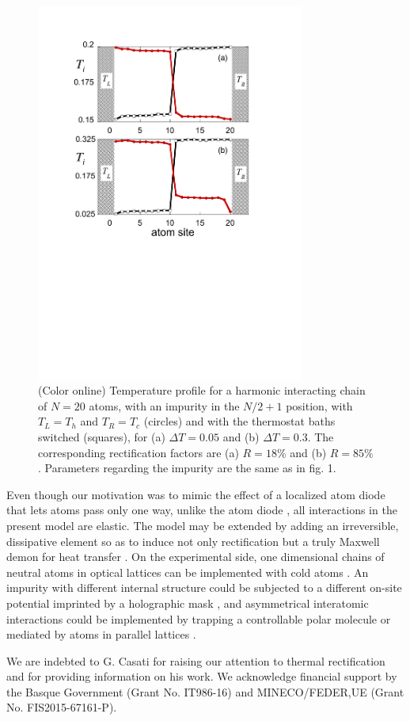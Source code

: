 \begin{figure}
\centering
\includegraphics[width=8.8cm]{Figures/FIG6.pdf}
\caption{(Color online) Temperature profile for a harmonic interacting chain of $N=20$ atoms, with an impurity in the $N/2+1$ position, with $T_L=T_h$ and $T_R=T_c$ (circles) and with the thermostat baths switched (squares), for (a) $\Delta T = 0.05$ and (b)  $\Delta T = 0.3$. The corresponding rectification factors are (a) $R=18\%$ and (b) $R=85\%$. Parameters regarding the impurity are the same as in fig. 1.
}
\label{figure6}
\end{figure}

Even though our motivation was to mimic the effect of a localized atom diode that lets atoms pass only one way,
unlike the atom diode \cite{Ruschhaupt2004}, all interactions in the present model
are elastic. The model may be extended by adding an irreversible,  dissipative element so as to induce not only rectification but a truly Maxwell demon for heat transfer \cite{Skordos1992,Ruschhaupt2006}.
On the experimental side, one dimensional chains of neutral atoms in optical lattices can be implemented with cold atoms \cite{Bloch2005}.
An impurity with different internal structure could be subjected to a different on-site potential imprinted by a holographic mask \cite{Bakr2009}, and asymmetrical interatomic interactions
could be implemented by trapping a controllable polar molecule or mediated by atoms in parallel lattices \cite{Gollub2014}.


We are  indebted to G. Casati for raising our attention to thermal rectification and for providing information on his work. We acknowledge financial support by the
Basque Government (Grant No.  IT986-16) and MINECO/FEDER,UE (Grant No. FIS2015-67161-P).
